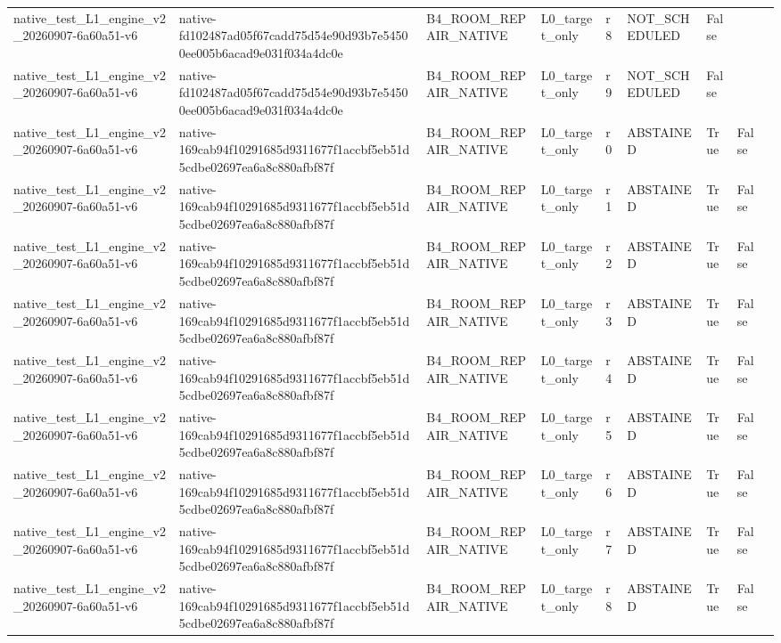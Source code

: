 \begin{tabular}{lllllllll}
native\_test\_L1\_engine\_v2\_20260907-6a60a51-v6 & native-fd102487ad05f67cadd75d54e90d93b7e54500ee005b6acad9e031f034a4dc0e & B4\_ROOM\_REPAIR\_NATIVE & L0\_target\_only & r8 & NOT\_SCHEDULED & False &  &  \\
native\_test\_L1\_engine\_v2\_20260907-6a60a51-v6 & native-fd102487ad05f67cadd75d54e90d93b7e54500ee005b6acad9e031f034a4dc0e & B4\_ROOM\_REPAIR\_NATIVE & L0\_target\_only & r9 & NOT\_SCHEDULED & False &  &  \\
native\_test\_L1\_engine\_v2\_20260907-6a60a51-v6 & native-169cab94f10291685d9311677f1accbf5eb51d5cdbe02697ea6a8c880afbf87f & B4\_ROOM\_REPAIR\_NATIVE & L0\_target\_only & r0 & ABSTAINED & True & False &  \\
native\_test\_L1\_engine\_v2\_20260907-6a60a51-v6 & native-169cab94f10291685d9311677f1accbf5eb51d5cdbe02697ea6a8c880afbf87f & B4\_ROOM\_REPAIR\_NATIVE & L0\_target\_only & r1 & ABSTAINED & True & False &  \\
native\_test\_L1\_engine\_v2\_20260907-6a60a51-v6 & native-169cab94f10291685d9311677f1accbf5eb51d5cdbe02697ea6a8c880afbf87f & B4\_ROOM\_REPAIR\_NATIVE & L0\_target\_only & r2 & ABSTAINED & True & False &  \\
native\_test\_L1\_engine\_v2\_20260907-6a60a51-v6 & native-169cab94f10291685d9311677f1accbf5eb51d5cdbe02697ea6a8c880afbf87f & B4\_ROOM\_REPAIR\_NATIVE & L0\_target\_only & r3 & ABSTAINED & True & False &  \\
native\_test\_L1\_engine\_v2\_20260907-6a60a51-v6 & native-169cab94f10291685d9311677f1accbf5eb51d5cdbe02697ea6a8c880afbf87f & B4\_ROOM\_REPAIR\_NATIVE & L0\_target\_only & r4 & ABSTAINED & True & False &  \\
native\_test\_L1\_engine\_v2\_20260907-6a60a51-v6 & native-169cab94f10291685d9311677f1accbf5eb51d5cdbe02697ea6a8c880afbf87f & B4\_ROOM\_REPAIR\_NATIVE & L0\_target\_only & r5 & ABSTAINED & True & False &  \\
native\_test\_L1\_engine\_v2\_20260907-6a60a51-v6 & native-169cab94f10291685d9311677f1accbf5eb51d5cdbe02697ea6a8c880afbf87f & B4\_ROOM\_REPAIR\_NATIVE & L0\_target\_only & r6 & ABSTAINED & True & False &  \\
native\_test\_L1\_engine\_v2\_20260907-6a60a51-v6 & native-169cab94f10291685d9311677f1accbf5eb51d5cdbe02697ea6a8c880afbf87f & B4\_ROOM\_REPAIR\_NATIVE & L0\_target\_only & r7 & ABSTAINED & True & False &  \\
native\_test\_L1\_engine\_v2\_20260907-6a60a51-v6 & native-169cab94f10291685d9311677f1accbf5eb51d5cdbe02697ea6a8c880afbf87f & B4\_ROOM\_REPAIR\_NATIVE & L0\_target\_only & r8 & ABSTAINED & True & False &  \\

\end{tabular}
